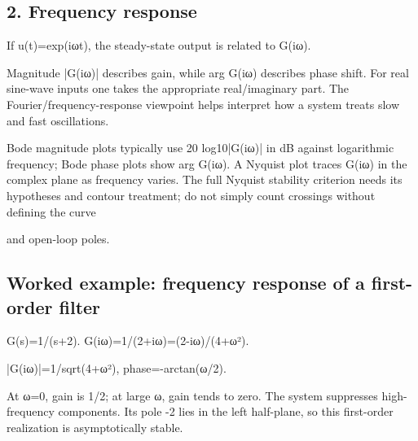 \documentclass[11pt,a4paper]{article}
\begin{document}
\subsection{2. Frequency response}
\begin{equationbox}\raggedright
{\ttfamily\small If u(t)=exp(iωt), the steady-state output is related to G(iω).}\par
\end{equationbox}
\begin{conceptbox}Magnitude |G(iω)| describes gain, while arg G(iω) describes phase shift. For real sine-wave inputs one takes the appropriate real/imaginary part. The Fourier/frequency-response viewpoint helps interpret how a system treats slow and fast oscillations.\end{conceptbox}
\begin{conceptbox}Bode magnitude plots typically use 20 log10|G(iω)| in dB against logarithmic frequency; Bode phase plots show arg G(iω). A Nyquist plot traces G(iω) in the complex plane as frequency varies. The full Nyquist stability criterion needs its hypotheses and contour treatment; do not simply count crossings without defining the curve\end{conceptbox}
\begin{conceptbox}and open-loop poles.\end{conceptbox}

\subsection{Worked example: frequency response of a first-order filter}
\begin{equationbox}\raggedright
{\ttfamily\small G(s)=1/(s+2). G(iω)=1/(2+iω)=(2-iω)/(4+ω²).}\par
\end{equationbox}
\begin{equationbox}\raggedright
{\ttfamily\small |G(iω)|=1/sqrt(4+ω²), phase=-arctan(ω/2).}\par
\end{equationbox}
\begin{conceptbox}At ω=0, gain is 1/2; at large ω, gain tends to zero. The system suppresses high-frequency components. Its pole -2 lies in the left half-plane, so this first-order realization is asymptotically stable.\end{conceptbox}
\end{document}
